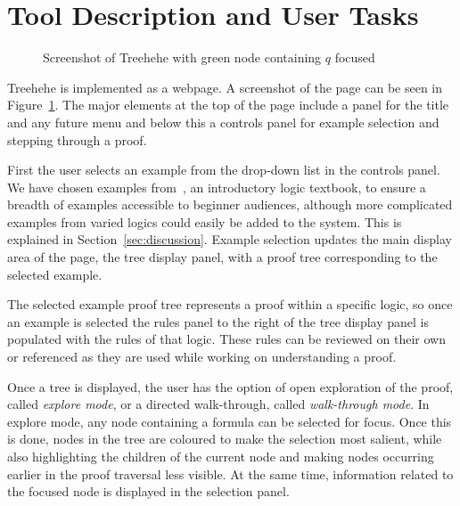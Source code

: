 \documentclass[conference]{IEEEtran}
\newcommand{\projectname}{Treehehe}
\begin{document}
\section{Tool Description and User Tasks}
\label{sec:tooldesc}

\begin{figure}

\begin{center}
\end{center}

\caption{Screenshot of \projectname{} with green node containing $q$ focused}
\label{fig:screenshot}

\end{figure}

\projectname{} is implemented as a webpage. A screenshot of the page can be seen in Figure~\ref{fig:screenshot}. The major elements at the top of the page include a panel for the title and any future menu and below this a controls panel for example selection and stepping through a proof.

First the user selects an example from the drop-down list in the controls panel. We have chosen examples from~\cite{logicincs-huth+ryan}, an introductory logic textbook, to ensure a breadth of examples accessible to beginner audiences, although more complicated examples from varied logics could easily be added to the system. This is explained in Section~\ref{sec:discussion}. Example selection updates the main display area of the page, the tree display panel, with a proof tree corresponding to the selected example.

The selected example proof tree represents a proof within a specific logic, so once an example is selected the rules panel to the right of the tree display panel is populated with the rules of that logic. These rules can be reviewed on their own or referenced as they are used while working on understanding a proof.

Once a tree is displayed, the user has the option of open exploration of the proof, called \textit{explore mode}, or a directed walk-through, called \textit{walk-through mode}. In explore mode, any node containing a formula can be selected for focus. Once this is done, nodes in the tree are coloured to make the selection most salient, while also highlighting the children of the current node and making nodes occurring earlier in the proof traversal less visible. At the same time, information related to the focused node is displayed in the selection panel.
\end{document}
